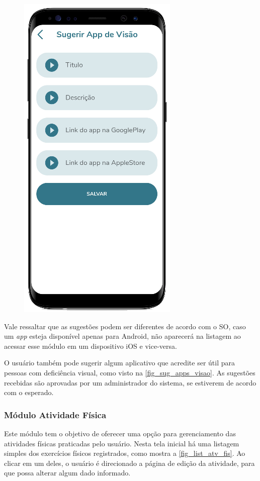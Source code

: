 \begin{figure}[htb]
\begin{minipage}{0.45\textwidth}
        \includegraphics[scale=0.66]{Imagens/desenvolvimento/app/sug_apps_visao.png}
    \end{minipage}
\end{figure}

Vale ressaltar que as sugestões podem ser diferentes de acordo com o SO, caso um \emph{app} esteja disponível
apenas para Android, não aparecerá na listagem ao acessar esse módulo em um dispositivo iOS e vice-versa.

O usuário também pode sugerir algum aplicativo que acredite ser útil para pessoas com deficiência visual, como
visto na \autoref{fig_sug_apps_visao}. As sugestões recebidas são aprovadas por um administrador do sistema, se
estiverem de acordo com o esperado.

\subsubsection{Módulo Atividade Física}

Este módulo tem o objetivo de oferecer uma opção para gerenciamento das atividades físicas praticadas
pelo usuário. Nesta tela inicial há uma listagem simples dos exercícios físicos registrados, como mostra a
\autoref{fig_list_atv_fis}. Ao clicar em um deles, o usuário é direcionado a página de edição da atividade,
para que possa alterar algum dado informado.

